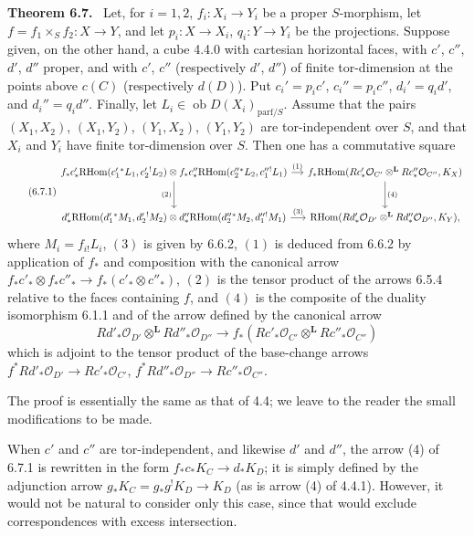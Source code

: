 \documentclass[11pt]{article}
\providecommand{\cO}{\mathcal{O}}
\newenvironment{statement}[1]{\par\medskip\noindent\textbf{#1.}\ }{\par\medskip}
\providecommand{\RHom}{\mathrm{RHom}}
\providecommand{\RHom}{\mathrm{RHom}}
\providecommand{\RHom}{\mathrm R\mathcal{H}om}
\providecommand{\RHom}{\mathrm{RHom}}
\begin{document}
\begin{statement}{Theorem 6.7}
Let, for $i=1,2$, $f_i:X_i\to Y_i$ be a proper $S$-morphism, let $f=f_1\times_Sf_2:X\to Y$, and let $p_i:X\to X_i$, $q_i:Y\to Y_i$ be the projections. Suppose given, on the other hand, a cube 4.4.0 with cartesian horizontal faces, with $c'$, $c''$, $d'$, $d''$ proper, and with $c'$, $c''$ (respectively $d'$, $d''$) of finite tor-dimension at the points above $c(C)$ (respectively $d(D)$). Put $c_i'=p_ic'$, $c_i''=p_ic''$, $d_i'=q_id'$, and $d_i''=q_id''$. Finally, let $L_i\in\operatorname{ob}D(X_i)_{\mathrm{parf}/S}$. Assume that the pairs $(X_1,X_2)$, $(X_1,Y_2)$, $(Y_1,X_2)$, $(Y_1,Y_2)$ are tor-independent over $S$, and that $X_i$ and $Y_i$ have finite tor-dimension over $S$. Then one has a commutative square
\begin{equation}
\tag{6.7.1}
\begin{tikzcd}[column sep=small,row sep=large]
f_*c'_*\RHom(c_1'{}^*L_1,c_2'{}^!L_2)\otimes f_*c''_*\RHom(c_2''{}^*L_2,c_1''{}^!L_1) \arrow[r,"(1)"] \arrow[d,"(2)"']
& f_*\RHom(Rc'_*\cO_{C'}\otimes^{\mathbf L}Rc''_*\cO_{C''},K_X) \arrow[d,"(4)"] \\
d'_*\RHom(d_1'{}^*M_1,d_2'{}^!M_2)\otimes d''_*\RHom(d_2''{}^*M_2,d_1''{}^!M_1) \arrow[r,"(3)"]
& \RHom(Rd'_*\cO_{D'}\otimes^{\mathbf L}Rd''_*\cO_{D''},K_Y),
\end{tikzcd}
\end{equation}
where $M_i=f_{i!}L_i$, $(3)$ is given by 6.6.2, $(1)$ is deduced from 6.6.2 by application of $f_*$ and composition with the canonical arrow $f_*c'_*\otimes f_*c''_*\to f_*(c'_*\otimes c''_*)$, $(2)$ is the tensor product of the arrows 6.5.4 relative to the faces containing $f$, and $(4)$ is the composite of the duality isomorphism 6.1.1 and of the arrow defined by the canonical arrow
\[
Rd'_*\cO_{D'}\otimes^{\mathbf L}Rd''_*\cO_{D''}\longrightarrow f_*(Rc'_*\cO_{C'}\otimes^{\mathbf L}Rc''_*\cO_{C''})
\]
which is adjoint to the tensor product of the base-change arrows $f^*Rd'_*\cO_{D'}\to Rc'_*\cO_{C'}$, $f^*Rd''_*\cO_{D''}\to Rc''_*\cO_{C''}$.
\end{statement}

The proof is essentially the same as that of 4.4; we leave to the reader the small modifications to be made.

When $c'$ and $c''$ are tor-independent, and likewise $d'$ and $d''$, the arrow (4) of 6.7.1 is rewritten in the form $f_*c_*K_C\to d_*K_D$; it is simply defined by the adjunction arrow $g_*K_C=g_*g^!K_D\to K_D$ (as is arrow (4) of 4.4.1). However, it would not be natural to consider only this case, since that would exclude correspondences with excess intersection.
\end{document}
